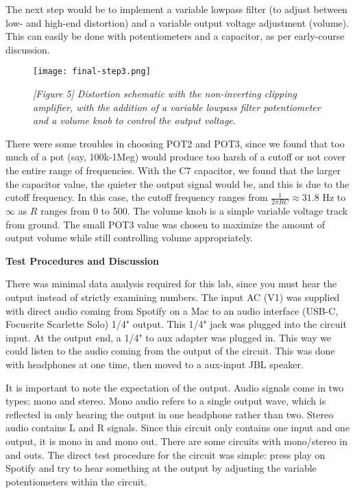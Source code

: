 \documentclass[11pt]{article}
\begin{document}
The next step would be to implement a variable lowpass filter (to adjust between low- and high-end distortion) and a variable output voltage adjustment (volume). This can easily be done with potentiometers and a capacitor, as per early-course discussion. 

\begin{figure}[H]
    \centering
    \texttt{[image: final-step3.png]}
    \caption*{\textit{[Figure 5] Distortion schematic with the non-inverting clipping amplifier, with the addition of a variable lowpass filter potentiometer and a volume knob to control the output voltage.}}
\end{figure}

There were some troubles in choosing POT2 and POT3, since we found that too much of a pot (say, 100k-1Meg) would produce too harsh of a cutoff or not cover the entire range of frequencies. With the C7 capacitor, we found that the larger the capacitor value, the quieter the output signal would be, and this is due to the cutoff frequency. In this case, the cutoff frequency ranges from $\frac{1}{2\pi RC} \approx 31.8$ Hz to $\infty$ as $R$ ranges from 0 to 500. The volume knob is a simple variable voltage track from ground. The small POT3 value was chosen to maximize the amount of output volume while still controlling volume appropriately. 



\vspace{10pt}


 \selectfont 

\nd \textbf{Test Procedures and Discussion}

\vspace{5pt}

\selectfont There was minimal data analysis required for this lab, since you must hear the output instead of strictly examining numbers. The input AC (V1) was supplied with direct audio coming from Spotify on a Mac to an audio interface (USB-C, Focusrite Scarlette Solo) 1/4" output. This 1/4" jack was plugged into the circuit input. At the output end, a 1/4" to aux adapter was plugged in. This way we could listen to the audio coming from the output of the circuit. This was done with headphones at one time, then moved to a aux-input JBL speaker. 

It is important to note the expectation of the output. Audio signals come in two types: mono and stereo. Mono audio refers to a single output wave, which is reflected in only hearing the output in one headphone rather than two. Stereo audio contains L and R signals. Since this circuit only contains one input and one output, it is mono in and mono out. There are some circuits with mono/stereo in and outs. The direct test procedure for the circuit was simple: press play on Spotify and try to hear something at the output by adjusting the variable potentiometers within the circuit. 
\end{document}
